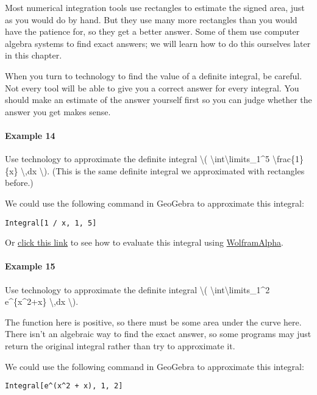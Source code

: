 Most numerical integration tools use rectangles to estimate the signed
area, just as you would do by hand. But they use many more rectangles
than you would have the patience for, so they get a better answer. Some
of them use computer algebra systems to find exact answers; we will
learn how to do this ourselves later in this chapter.

When you turn to technology to find the value of a definite integral, be
careful. Not every tool will be able to give you a correct answer for
every integral. You should make an estimate of the answer yourself first
so you can judge whether the answer you get makes sense.

\hypertarget{example-14}{%
\paragraph{Example 14}\label{example-14}}

Use technology to approximate the definite integral \textbackslash{}(
\textbackslash{}int\textbackslash{}limits\_1\^{}5
\textbackslash{}frac\{1\}\{x\} \textbackslash{},dx \textbackslash{}).
(This is the same definite integral we approximated with rectangles
before.)

We could use the following command in GeoGebra to approximate this
integral:

\texttt{Integral{[}1\ /\ x,\ 1,\ 5{]}}

Or
\href{http://www.wolframalpha.com/input/?i=integrate+1\%2Fx+from+1+to+5}{click
this link} to see how to evaluate this integral using
\href{http://www.wolframalpha.com/}{Wolfram\textbar{}Alpha}.

\hypertarget{example-15}{%
\paragraph{Example 15}\label{example-15}}

Use technology to approximate the definite integral \textbackslash{}(
\textbackslash{}int\textbackslash{}limits\_1\^{}2 e\^{}\{x\^{}2+x\}
\textbackslash{},dx \textbackslash{}).

The function here is positive, so there must be some area under the
curve here. There isn't an algebraic way to find the exact answer, so
some programs may just return the original integral rather than try to
approximate it.

We could use the following command in GeoGebra to approximate this
integral:

\texttt{Integral{[}e\^{}(x\^{}2\ +\ x),\ 1,\ 2{]}}

